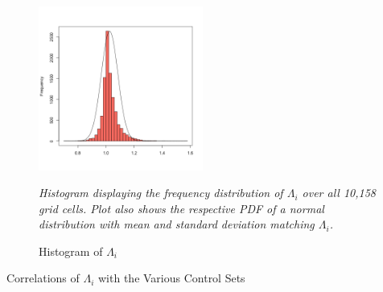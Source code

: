 \documentclass[11pt, oneside]{article}   	%
\newcommand{\mysubcaption}[1]{
\justify
\begin{spacing}{0.7}
\textit{\footnotesize #1}
\end{spacing}}
\begin{document}
\begin{spacing}{1.3}
  \begin{figure}[!h]
  \centering
  \caption{Histogram of $\Lambda_{i}$}

  \includegraphics[width=0.48\textwidth,trim={1cm 1cm 1cm 1.5cm},clip]{../../Analysis/output/descriptives/histogram.png}
  \label{fig:APP:histogram_lambda}

  \mysubcaption{Histogram displaying the frequency distribution of $\Lambda_{i}$ over all 10,158 grid cells. Plot also shows the respective PDF of a normal distribution with mean and standard deviation matching $\Lambda_{i}$.}
  \end{figure}

    \begin{table}[h] \centering
      \caption{Correlations of $\Lambda_{i}$ with the Various Control Sets}
      \label{tab:APP:basic_corrs}
      \resizebox{!}{0.48\textheight}{


}
\end{table}
\end{spacing}
\end{document}
